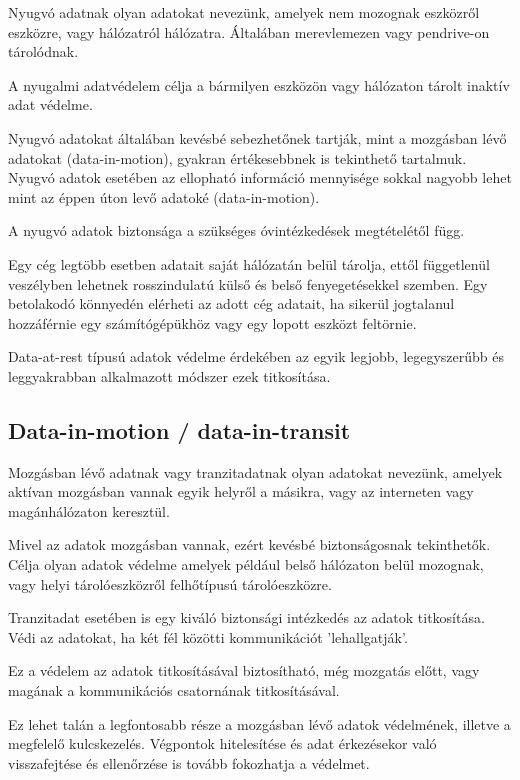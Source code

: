 Nyugvó adatnak olyan adatokat nevezünk, amelyek nem mozognak eszközről eszközre, vagy hálózatról hálózatra. Általában merevlemezen vagy pendrive-on tárolódnak.

A nyugalmi adatvédelem célja a bármilyen eszközön vagy hálózaton tárolt inaktív adat védelme.

Nyugvó adatokat általában kevésbé sebezhetőnek tartják, mint a mozgásban lévő adatokat (data-in-motion), gyakran értékesebbnek is tekinthető tartalmuk. Nyugvó adatok esetében az ellopható információ mennyisége sokkal nagyobb lehet mint az éppen úton levő adatoké (data-in-motion).

A nyugvó adatok biztonsága a szükséges óvintézkedések megtételétől függ.

Egy cég legtöbb esetben adatait saját hálózatán belül tárolja, ettől függetlenül veszélyben lehetnek rosszindulatú külső és belső fenyegetésekkel szemben. Egy betolakodó könnyedén elérheti az adott cég adatait, ha sikerül jogtalanul hozzáférnie egy számítógépükhöz vagy egy lopott eszközt feltörnie.

Data-at-rest típusú adatok védelme érdekében az egyik legjobb, legegyszerűbb és leggyakrabban alkalmazott módszer ezek titkosítása.

\subsection{Data-in-motion / data-in-transit}

Mozgásban lévő adatnak vagy tranzitadatnak olyan adatokat nevezünk, amelyek aktívan mozgásban vannak egyik helyről a másikra, vagy az interneten vagy magánhálózaton keresztül.

Mivel az adatok mozgásban vannak, ezért kevésbé biztonságosnak tekinthetők. Célja olyan adatok védelme amelyek például belső hálózaton belül mozognak, vagy helyi tárolóeszközről felhőtípusú tárolóeszközre.

Tranzitadat esetében is egy kiváló biztonsági intézkedés az adatok titkosítása. Védi az adatokat, ha két fél közötti kommunikációt ’lehallgatják’.

Ez a védelem az adatok titkosításával biztosítható, még mozgatás előtt, vagy magának a kommunikációs csatornának titkosításával.

Ez lehet talán a legfontosabb része a mozgásban lévő adatok védelmének, illetve a megfelelő kulcskezelés. Végpontok hitelesítése és adat érkezésekor való visszafejtése és ellenőrzése is tovább fokozhatja a védelmet. 

